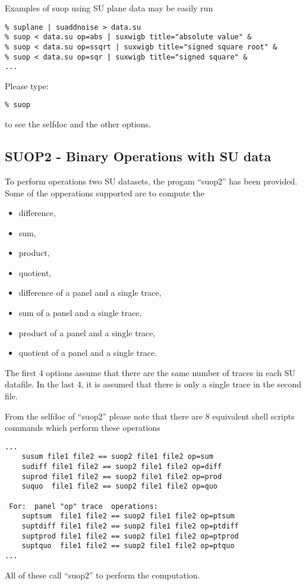 {{{{{{{Examples of suop using SU plane data may be easily run
{\small\begin{verbatim}
% suplane | suaddnoise > data.su
% suop < data.su op=abs | suxwigb title="absolute value" &
% suop < data.su op=ssqrt | suxwigb title="signed square root" &
% suop < data.su op=sqr | suxwigb title="signed square" &
...
\end{verbatim}}\noindent

Please type:
{\small\begin{verbatim}
% suop
\end{verbatim}}\noindent
to see the selfdoc and the other options.

\subsection{SUOP2 - Binary Operations with SU data}

To perform operations two SU datasets, the progam ``suop2''
has been provided.
Some of the opperations supported are to compute the
\begin{itemize}
\item difference,
\item sum,
\item product,
\item quotient,
\item difference of a panel and a single trace,
\item sum of a panel and a single trace,
\item product of a panel and a single trace,
\item quotient of a panel and a single trace.
\end{itemize}
The first 4 options assume that there are the same number
of traces in each SU datafile. In the last 4,
it is assumed that there is only a single trace in the
second file.

From the selfdoc of ``suop2'' please note that there are
8 equivalent shell scripts commands which perform these
operations 
{\small\begin{verbatim}
...
 	susum file1 file2 == suop2 file1 file2 op=sum			
 	sudiff file1 file2 == suop2 file1 file2 op=diff			
 	suprod file1 file2 == suop2 file1 file2 op=prod			
 	suquo  file1 file2 == suop2 file1 file2 op=quo			

 For:  panel "op" trace  operations: 				
 	suptsum  file1 file2 == suop2 file1 file2 op=ptsum		
 	suptdiff file1 file2 == suop2 file1 file2 op=ptdiff		
 	suptprod file1 file2 == suop2 file1 file2 op=ptprod		
 	suptquo  file1 file2 == suop2 file1 file2 op=ptquo		
...
\end{verbatim}}\noindent
All of these call ``suop2'' to perform the computation.

}}}}}}}
